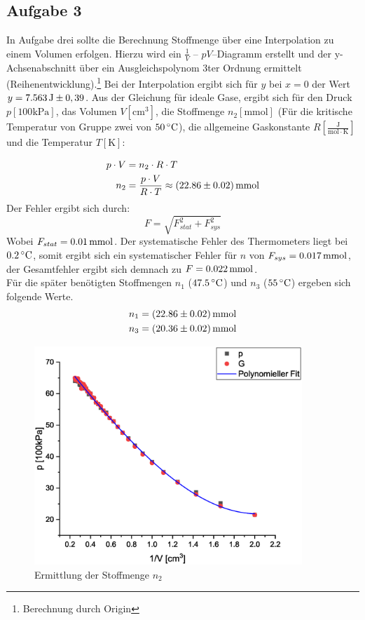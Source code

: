 \subsection{Aufgabe 3}
In Aufgabe drei sollte die Berechnung Stoffmenge über eine Interpolation zu einem Volumen erfolgen. Hierzu wird ein $\frac{1}{V}$ -- $pV$--Diagramm erstellt und der y-Achsenabschnitt über ein Ausgleichspolynom 3ter Ordnung ermittelt (Reihenentwicklung).\footnote{Berechnung durch Origin} Bei der Interpolation ergibt sich für $y$ bei $x=0$ der Wert $y=\unit[7.563]{J}  \pm 0,39$. Aus der Gleichung für ideale Gase, ergibt sich für den Druck $p [\mathrm{100kPa}]$, das Volumen $V [\mathrm{cm^3}]$, die Stoffmenge $n_2 [\mathrm{mmol}]$ (Für die kritische Temperatur von Gruppe zwei von $\unit[50]{^\circ C}$), die allgemeine Gaskonstante $R [\mathrm{\frac{J}{mol \cdot K}}]$ und die Temperatur $T [\mathrm{K}]$:

\begin{align}
p \cdot V &= n_2 \cdot R \cdot T\\
n_2 &= \frac{p \cdot V}{R \cdot T} \approx \unit[(22.86 \pm 0.02)]{mmol} \notag
\end{align}
Der Fehler ergibt sich durch:
\[
F = \sqrt{F_{stat}^2 + F_{sys}^2}
\]
Wobei $F_{stat} = \unit[0.01]{mmol}$. Der systematische Fehler des Thermometers liegt bei $\unit[0.2]{^\circ C}$, somit ergibt sich ein systematischer Fehler für $n$ von $F_{sys} = \unit[0.017]{mmol}$, der Gesamtfehler ergibt sich demnach zu $F = \unit[0.022]{mmol}$. \\
Für die später benötigten Stoffmengen $n_1$ ($\unit[47.5]{^\circ C}$) und $n_3$ ($\unit[55]{^\circ C}$) ergeben sich folgende Werte.
\begin{align*}
n_1 &= \unit[(22.86 \pm 0.02)]{mmol}\\
n_3 &= \unit[(20.36 \pm 0.02)]{mmol}
\end{align*}

\begin{figure}
\begin{center}
\includegraphics[width=0.9\textwidth]{Bilder/aufgabe_3.eps}
\caption{Ermittlung der Stoffmenge $n_2$}
\label{fig:aufgabe3}
\end{center}
\end{figure}